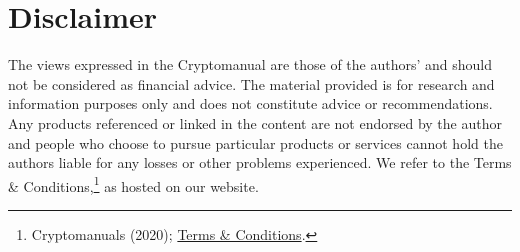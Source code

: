 \chapter*{Disclaimer}
The views expressed in the Cryptomanual are those of the authors' and should not be considered as financial advice.
The material provided is for research and information purposes only and does not constitute advice or recommendations. Any products referenced or linked in the content are not endorsed by the author and people who choose to pursue particular products or services cannot hold the authors liable for any losses or other problems experienced. We refer to the Terms \& Conditions,\footnote{Cryptomanuals (2020); \href{https://cryptomanuals.com/terms-conditions/}{Terms \& Conditions}.} as hosted on our website.
